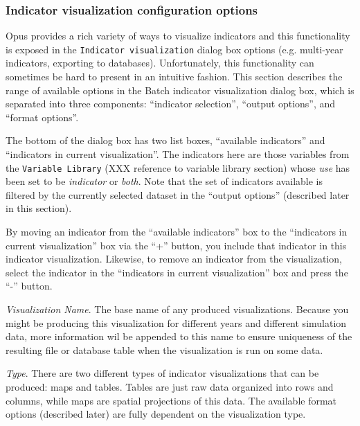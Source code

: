 \subsubsection{Indicator visualization configuration options}
\label{sect:indicator-visualization-options}

Opus provides a rich variety of ways to visualize indicators and this
functionality is exposed in the \verb#Indicator visualization# dialog
box options (e.g. multi-year indicators, exporting to
databases). Unfortunately, this functionality can sometimes be hard
to present in an intuitive fashion. This section describes the range
of available options in the Batch indicator visualization dialog
box, which is separated into three components: ``indicator
selection'', ``output options'', and ``format options''. 


The bottom of the dialog box has two list boxes, ``available
indicators'' and ``indicators in current visualization''. The
indicators here are those variables from the \verb#Variable Library#
(XXX reference to variable library section) whose \emph{use} has been
set to be \emph{indicator} or \emph{both}. Note that the set of
indicators available is filtered by the currently selected dataset in
the ``output options'' (described later in this section).

By moving an indicator from the ``available indicators'' box to the
``indicators in current visualization'' box via the ``+'' button, you
include that indicator in this indicator visualization. Likewise, to
remove an indicator from the visualization, select the indicator in
the ``indicators in current visualization'' box and press the ``-''
button.



\emph{Visualization Name}. The base name of any produced
visualizations. Because you might be producing this visualization for
different years and different simulation data, more information wil
be appended to this name to ensure uniqueness of the resulting file
or database table when the visualization is run on some data. 

\emph{Type}. There are two different types of indicator
visualizations that can be produced: maps and tables. Tables are just
raw data organized into rows and columns, while maps are
spatial projections of this data. The available format options
(described later) are fully dependent on the visualization type. 

